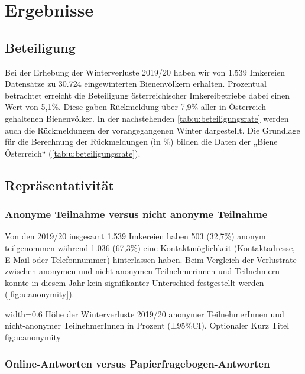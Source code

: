 \section{Ergebnisse}
\subsection{Beteiligung}

Bei der Erhebung der Winterverluste 2019/20 haben wir von 1.539 Imkereien Datensätze zu 30.724 eingewinterten Bienenvölkern erhalten. Prozentual betrachtet erreicht die Beteiligung österreichischer Imkereibetriebe dabei einen Wert von 5,1\%. Diese gaben Rückmeldung über 7,9\% aller in Österreich gehaltenen Bienenvölker. In der nachstehenden \cref{tab:u:beteiligungsrate} werden auch die Rückmeldungen der vorangegangenen Winter dargestellt. Die Grundlage für die Berechnung der Rückmeldungen (in \%) bilden die Daten der „Biene Österreich`` (\cref{tab:u:beteiligungsrate}).



\newpage

\subsection{Repräsentativität}
\subsubsection{Anonyme Teilnahme versus nicht anonyme Teilnahme}

Von den 2019/20 insgesamt 1.539 Imkereien haben 503 (32,7\%) anonym teilgenommen während 1.036 (67,3\%) eine Kontaktmöglichkeit (Kontaktadresse, E-Mail oder Telefonnummer) hinterlassen haben. Beim Vergleich der Verlustrate zwischen anonymen  und nicht-anonymen Teilnehmerinnen und Teilnehmern  konnte in diesem Jahr kein signifikanter Unterschied festgestellt werden (\cref{fig:u:anonymity}).

  {width=0.6\textwidth} %
  {Höhe der Winterverluste 2019/20 anonymer TeilnehmerInnen und nicht-anonymer Teilnehmer\-Innen in Prozent (±95\%CI).} %
  {Optionaler Kurz Titel} %
  {fig:u:anonymity} %
  

\subsubsection{Online-Antworten versus Papierfragebogen-Antworten}

